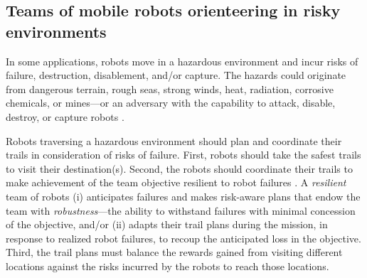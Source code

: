 \documentclass[11pt, oneside]{article}
\begin{document}
\subsection{Teams of mobile robots orienteering in risky environments} 
In some applications, robots move in a hazardous environment and incur risks of failure, destruction, disablement, and/or capture. 
The hazards could originate from dangerous terrain, rough seas, strong winds, heat, radiation, corrosive chemicals, or mines---or an adversary with the capability to attack, disable, destroy, or capture robots \cite{agmon2017robotic}. 

Robots traversing a hazardous environment should plan and coordinate their trails in consideration of risks of failure.
First, robots should take the safest trails to visit their destination(s). 
Second, the robots should coordinate their trails to make achievement of the team objective resilient to robot failures \cite{zhou2021multi}. 
A \emph{resilient} team of robots \cite{prorok2021beyond}
(i) anticipates failures and makes risk-aware plans that endow the team with \emph{robustness}---the ability to withstand failures with minimal concession of the objective,
and/or
(ii) adapts their trail plans during the mission, in response to realized robot failures, to recoup the anticipated loss in the objective. 
Third, the trail plans must balance the rewards gained from visiting different locations against the risks incurred by the robots to reach those locations.
\end{document}
